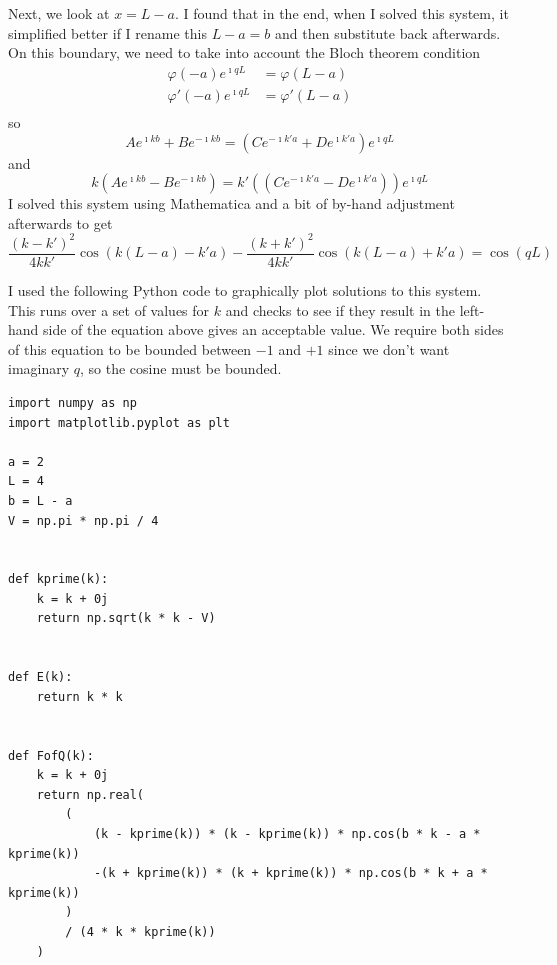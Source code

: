 \documentclass[a4paper,twoside]{article}
\begin{document}
\begin{itemize}
\begin{problem}
            Next, we look at $ x = L - a $. I found that in the end, when I solved this system, it simplified better if I rename this $ L - a = b $ and then substitute back afterwards. On this boundary, we need to take into account the Bloch theorem condition
            \begin{align}
                \varphi(-a) e^{\imath qL} &= \varphi(L-a) \\
                \varphi'(-a) e^{\imath qL} &= \varphi'(L-a) \\
            \end{align}
            so
            \begin{equation}
                A e^{\imath kb} + B e^{- \imath kb} = (C e^{- \imath k'a} + D e^{\imath k'a} ) e^{\imath q L}
            \end{equation}
            and
            \begin{equation}
                k(A e^{\imath kb} - B e^{- \imath kb}) = k'((C e^{- \imath k'a} - D e^{\imath k'a} )) e^{\imath q L}
            \end{equation}
            I solved this system using Mathematica and a bit of by-hand adjustment afterwards to get
            \begin{equation}
                \frac{(k - k')^2}{4kk'} \cos(k(L-a)-k'a) - \frac{(k+k')^2}{4kk'} \cos(k(L-a)+k'a) = \cos(qL)
            \end{equation}

            I used the following Python code to graphically plot solutions to this system. This runs over a set of values for $ k $ and checks to see if they result in the left-hand side of the equation above gives an acceptable value. We require both sides of this equation to be bounded between $ -1 $ and $ +1 $ since we don't want imaginary $ q $, so the cosine must be bounded.
            \hr
            \begin{verbatim}
import numpy as np
import matplotlib.pyplot as plt

a = 2
L = 4
b = L - a
V = np.pi * np.pi / 4


def kprime(k):
    k = k + 0j
    return np.sqrt(k * k - V)


def E(k):
    return k * k


def FofQ(k):
    k = k + 0j
    return np.real(
        (
            (k - kprime(k)) * (k - kprime(k)) * np.cos(b * k - a * kprime(k))
            -(k + kprime(k)) * (k + kprime(k)) * np.cos(b * k + a * kprime(k))
        )
        / (4 * k * kprime(k))
    )



\end{verbatim}
\end{problem}
\end{itemize}
\end{document}
